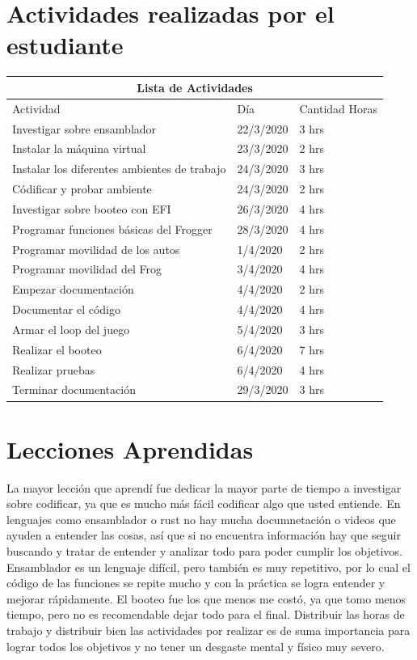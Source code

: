 \documentclass{article}
\begin{document}
\section{Actividades realizadas por el estudiante}

\begin{tabular}{ |p{3cm}||p{3cm}|p{3cm}|  }
 \hline
 \multicolumn{3}{|c|}{Lista de Actividades} \\
 \hline
 Actividad        & Día   &Cantidad Horas\\
 \hline
 Investigar sobre ensamblador   &22/3/2020     &3 hrs\\
 Instalar la máquina virtual   &23/3/2020     &2 hrs\\
 Instalar los diferentes ambientes de trabajo   &24/3/2020     &3 hrs\\
 Códificar y probar ambiente   &24/3/2020     &2 hrs\\
 Investigar sobre booteo con EFI   &26/3/2020     &4 hrs\\
 Programar funciones básicas del Frogger   &28/3/2020     &4 hrs\\
 Programar movilidad de los autos   &1/4/2020     &2 hrs\\
 Programar movilidad del Frog   &3/4/2020     &4 hrs\\
 Empezar documentación   &4/4/2020     &2 hrs\\
 Documentar el código   &4/4/2020     &4 hrs\\
 Armar el loop del juego   &5/4/2020     &3 hrs\\
 Realizar el booteo   &6/4/2020     &7 hrs\\
 Realizar pruebas   &6/4/2020     &4 hrs\\
 Terminar documentación   &29/3/2020     &3 hrs\\
 \hline
\end{tabular}

\section{Lecciones Aprendidas}
La mayor lección que aprendí fue dedicar la mayor parte de tiempo a investigar sobre codificar, ya que es mucho más fácil codificar algo que usted entiende. En lenguajes como 
ensamblador o rust no hay mucha documnetación o videos que ayuden a entender las cosas, así que si no encuentra información hay que seguir buscando y tratar de entender y 
analizar todo para poder cumplir los objetivos. Ensamblador es un lenguaje difícil, pero también es muy repetitivo, por lo cual el código de las funciones se repite mucho y 
con la práctica se logra entender y mejorar rápidamente. El booteo fue los que menos me costó, ya que tomo menos tiempo, pero no es recomendable dejar todo para el final. Distribuir las horas 
de trabajo y distribuir bien las actividades por realizar es de suma importancia para lograr todos los objetivos y no tener un desgaste mental y físico muy severo. 
\end{document}
